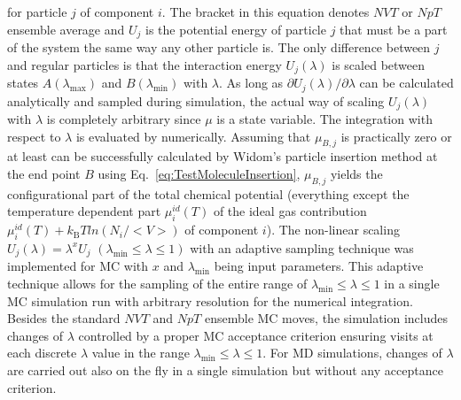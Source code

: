 for particle $j$ of component $i$. The bracket in this equation denotes $NVT$ or $NpT$ ensemble average and $U_j$ is the potential energy of particle $j$ that must be a part of the system the same way any other particle is. The only difference between $j$ and regular particles is that the interaction energy $U_j(\lambda)$ is scaled between states $A(\lambda_\text{max})$ and $B(\lambda_\text{min})$ with $\lambda$. As long as $\partial U_j(\lambda)/\partial \lambda$ can be calculated analytically and sampled during simulation, the actual way of scaling $U_j(\lambda)$ with $\lambda$ is completely arbitrary since $\mu$ is a state variable. The integration with respect to $\lambda$ is evaluated by numerically. Assuming that $\mu_{B,j}$ is practically zero or at least can be successfully calculated by Widom’s particle insertion method at the end point $B$ using Eq.~\eqref{eq:TestMoleculeInsertion}, $\mu_{B,j}$ yields the configurational part of the total chemical potential (everything except the temperature dependent part $\mu^{id}_{i}(T)$ of the ideal gas contribution $\mu^{id}_{i}(T) + k_\text{B}T ln(N_i/<V>)$ of component $i$). The non-linear scaling $U_j(\lambda)=\lambda^x U_j$ $(\lambda_\text{min} \leq \lambda \leq 1)$ with an adaptive sampling technique \parencite{Fasnacht_2004} was implemented for MC with $x$ and $\lambda_\text{min}$ being input parameters. This adaptive technique allows for the sampling of the entire range of $\lambda_\text{min} \leq \lambda \leq 1$ in a single MC simulation run with arbitrary resolution for the numerical integration. Besides the standard $NVT$ and $NpT$ ensemble MC moves, the simulation includes changes of $\lambda$ controlled by a proper MC acceptance criterion ensuring visits at each discrete $\lambda$ value in the range $\lambda_\text{min} \leq \lambda \leq 1$. For MD simulations, changes of $\lambda$ are carried out also on the fly in a single simulation but without any acceptance criterion.

